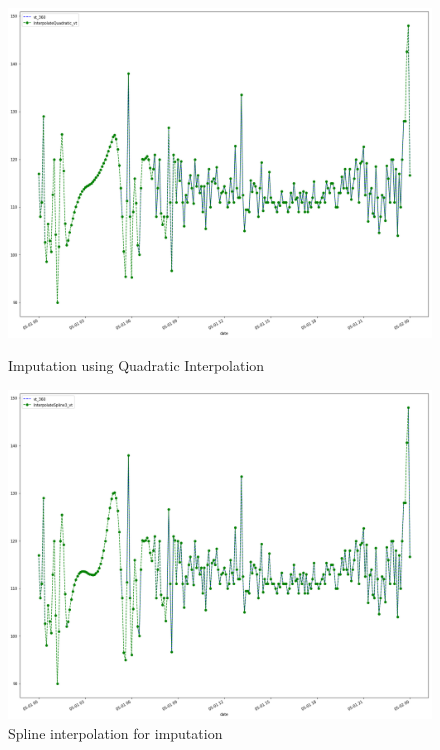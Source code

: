 %


\begin{figure}[H]
\centering
\begin{minipage}{.46\linewidth}
    \includegraphics[width=.9\textwidth]{img/quadratic.png}    
    \caption{Imputation using Quadratic Interpolation}
    \label{img1}
\end{minipage}
\hfill
\begin{minipage}{.49\linewidth}
    \includegraphics[width=.9\textwidth]{img/spline.png} 
    \caption{Spline interpolation for imputation}
    \label{img2}
\end{minipage}
\end{figure}


